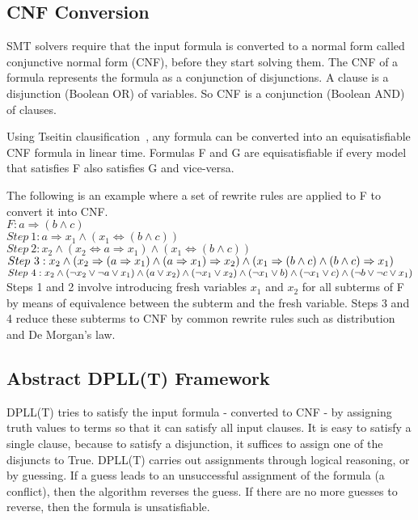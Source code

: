 \documentclass{report}
\begin{document}
\subsection{CNF Conversion}
\label{sec:cnf}
SMT solvers require that the input formula is converted to a 
normal form called conjunctive normal form (CNF), before they 
start solving them. The CNF of a formula represents the 
formula as a conjunction of disjunctions. A clause is a 
disjunction (Boolean OR) of variables. So CNF is a 
conjunction (Boolean AND) of clauses. 

Using Tseitin clausification~\cite{BEL01Handbook}, any formula 
can be converted into an equisatisfiable CNF formula 
in linear time. Formulas F and G are equisatisfiable if 
every model that satisfies F also satisfies G and vice-versa.

The following is an example where a set of rewrite rules
are applied to F to convert it into CNF. \\
$F: a \Rightarrow (b \land c)$ \\
$Step\ 1: a \Rightarrow x_1 \land (x_1 \iff (b \land c))$ \\
$Step\ 2: x_2 \land (x_2 \iff a \Rightarrow x_1) \land 
(x_1 \iff (b \land c))$ \\
$Step\ 3: x_2 \land \\
(x_2 \Rightarrow (a \Rightarrow x_1) \land 
(a \Rightarrow x_1) \Rightarrow x_2) \land \\
(x_1 \Rightarrow (b \land c) \land 
(b \land c) \Rightarrow x_1)$ \\
$Step\ 4: x_2 \land \\
(\neg x_2 \lor \neg a \lor x_1) \land 
(a \lor x_2) \land (\neg x_1 \lor x_2) \land \\
(\neg x_1 \lor b) \land (\neg x_1 \lor c) \land 
(\neg b \lor \neg c \lor x_1)$ \\
Steps 1 and 2 involve introducing fresh variables $x_1$
and $x_2$ for all subterms of F by means of equivalence 
between the subterm and the fresh variable. Steps 3 and 4 
reduce these subterms to CNF by common rewrite rules 
such as distribution and De Morgan's law.


\subsection{Abstract DPLL(T) Framework}
\label{sec:trans}
DPLL(T) tries to satisfy the input formula - converted to 
CNF - by assigning truth values to terms so that it can
satisfy all input clauses. It is easy to satisfy a single
clause, because to satisfy a disjunction, it suffices to
assign one of the disjuncts to True. DPLL(T) carries out
assignments through logical reasoning, or by guessing. If a
guess leads to an unsuccessful assignment of the formula 
(a conflict), then the algorithm reverses the guess. 
If there are no more guesses to reverse, then the formula is
unsatisfiable.
\end{document}

